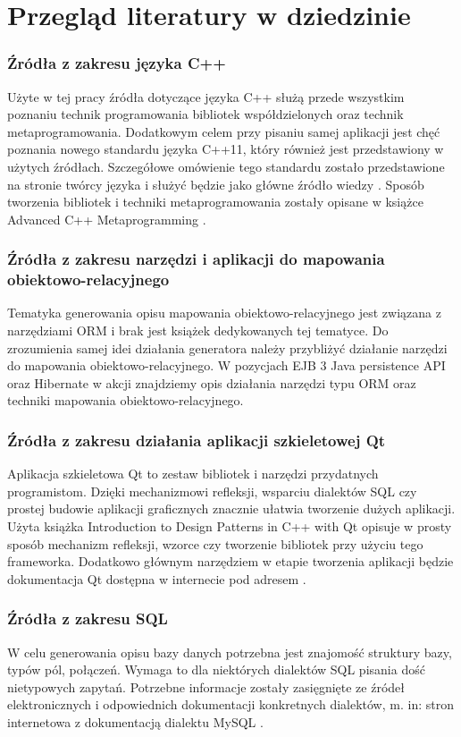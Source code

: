 \documentclass[12pt]{report}
\begin{document}
\section{Przegląd literatury w dziedzinie}
\subsubsection{Źródła z zakresu języka C++}
	\indent Użyte w tej pracy źródła dotyczące języka C++ służą przede wszystkim poznaniu technik programowania bibliotek współdzielonych oraz technik metaprogramowania. Dodatkowym celem przy pisaniu samej aplikacji jest chęć poznania nowego standardu języka C++11, który również jest przedstawiony w użytych źródłach. Szczegółowe omówienie tego standardu zostało przedstawione na stronie twórcy języka i służyć będzie jako główne źródło wiedzy \cite{strostrup}.
Sposób tworzenia bibliotek i techniki metaprogramowania zostały opisane w książce Advanced C++ Metaprogramming \cite{c++2}.
\subsubsection{Źródła z zakresu narzędzi i aplikacji do mapowania obiektowo-relacyjnego}
	\indent Tematyka generowania opisu mapowania obiektowo-relacyjnego jest związana z narzędziami ORM i brak jest książek dedykowanych tej tematyce. Do zrozumienia samej idei działania generatora należy przybliżyć działanie narzędzi do mapowania obiektowo-relacyjnego. W pozycjach EJB 3 Java persistence API \cite{ejb} oraz Hibernate w akcji \cite{hibernateInAction}
znajdziemy opis działania narzędzi typu ORM oraz techniki mapowania obiektowo-relacyjnego.
\subsubsection{Źródła z zakresu działania aplikacji szkieletowej Qt}
	\indent Aplikacja szkieletowa Qt to zestaw bibliotek i narzędzi przydatnych programistom. Dzięki mechanizmowi refleksji, wsparciu dialektów SQL czy prostej budowie aplikacji graficznych znacznie ułatwia tworzenie dużych aplikacji. Użyta książka Introduction to Design Patterns in C++ with Qt \cite{c++patterns}
opisuje w prosty sposób mechanizm refleksji, wzorce czy tworzenie bibliotek przy użyciu tego frameworka.
Dodatkowo głównym narzędziem w etapie tworzenia aplikacji będzie dokumentacja Qt dostępna w internecie pod adresem \cite{qtframework}.
\subsubsection{Źródła z zakresu SQL}
	\indent W celu generowania opisu bazy danych potrzebna jest znajomość struktury bazy, typów pól, połączeń. Wymaga to dla niektórych dialektów SQL pisania dość nietypowych zapytań. Potrzebne informacje zostały zasięgnięte ze źródeł elektronicznych i odpowiednich dokumentacji konkretnych dialektów, m. in: stron internetowa z dokumentacją dialektu MySQL \cite{mysqlweb}.
\end{document}
